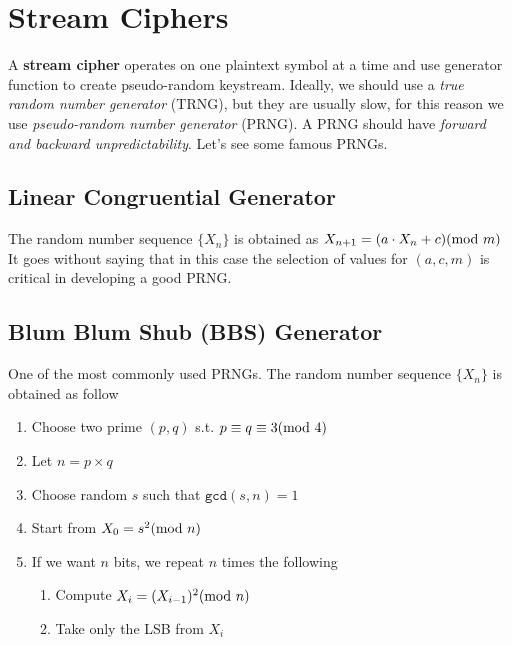 \section{Stream Ciphers}
A \textbf{stream cipher} operates on one plaintext symbol at a time and use generator function to create pseudo-random keystream. Ideally, we should use a \textit{true random number generator} (TRNG), but they are usually slow, for this reason we use \textit{pseudo-random number generator} (PRNG). A PRNG should have \textit{forward and backward unpredictability}. Let's see some famous PRNGs.
\subsection{Linear Congruential Generator}
The random number sequence $\{X_n\}$ is obtained as $X_{n+1} = (a\cdot X_n + c) (\mathrm{mod}\ m)$
It goes without saying that in this case the selection of values for $(a,c,m)$ is critical in developing a good PRNG.
\subsection{Blum Blum Shub (BBS) Generator}
One of the most commonly used PRNGs. The random number sequence $\{X_n\}$ is obtained as follow
\begin{enumerate}
    \item Choose two prime $(p,q)$ s.t. $p\equiv q\equiv 3 (\mathrm{mod}\ 4)$
    \item Let $n=p\times q$
    \item Choose random $s$ such that $\texttt{gcd}(s,n)=1$
    \item Start from $X_0=s^2 (\mathrm{mod}\ n)$
    \item If we want $n$ bits, we repeat $n$ times the following
    \begin{enumerate}
        \item Compute $X_i=(X_{i-1})^2 (\mathrm{mod}\ n)$
        \item Take only the LSB from $X_i$
    \end{enumerate}
\end{enumerate}

